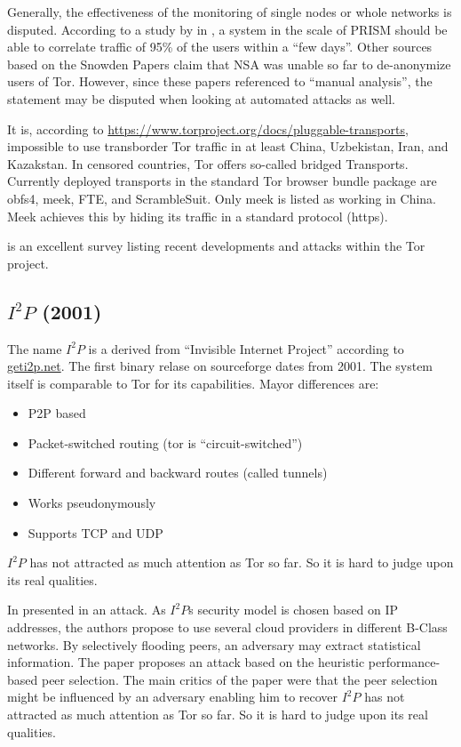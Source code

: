 Generally, the effectiveness of the monitoring of single nodes or whole networks is disputed. According to a study by \citeauthor{ccs2013-usersrouted} in \citeyear{ccs2013-usersrouted}\cite{ccs2013-usersrouted}, a system in the scale of PRISM should be able to correlate traffic of 95\% of the users within a ``few days''. Other sources based on the Snowden Papers claim that NSA was unable so far to de-anonymize users of  Tor. However, since these papers referenced to ``manual analysis'', the statement may be disputed when looking at automated attacks as well.

It is, according to \url{https://www.torproject.org/docs/pluggable-transports}, impossible to use transborder Tor traffic in at least China, Uzbekistan, Iran, and Kazakstan. In censored countries, Tor offers so-called bridged Transports. Currently deployed transports in the standard Tor browser bundle package are obfs4, meek, FTE, and ScrambleSuit. Only meek is listed as working in China. Meek achieves this by hiding its traffic in a standard protocol (https).

\cite{saleh2018shedding} is an excellent survey listing recent developments and attacks within the Tor project.

\subsection{\texorpdfstring{$I^2P$}{I2P} (2001)}
The name $I^2P$ is a derived from  ``Invisible Internet Project'' according to \href{https://geti2p.net/}{geti2p.net}. The first binary relase on sourceforge dates from 2001. The system itself is comparable to Tor for its capabilities. Mayor differences are:
\begin{itemize}
	\item P2P based
	\item Packet-switched routing (tor is ``circuit-switched'')
	\item Different forward and backward routes (called tunnels)
	\item Works pseudonymously
	\item Supports TCP and UDP
\end{itemize}

$I^2P$ has not attracted as much attention as Tor so far. So it is hard to judge upon its real qualities.

In \citeyear{pets2011-i2p} \citeauthor{pets2011-i2p} presented in \cite{pets2011-i2p} an attack. As $I^2P$s security model is chosen based on IP addresses, the authors propose to use several cloud providers in different B-Class networks. By selectively flooding peers, an adversary may extract statistical information. The paper proposes an attack based on the heuristic performance-based peer selection. The main critics of the paper were that the peer selection might be influenced by an adversary enabling him to recover $I^2P$ has not attracted as much attention as Tor so far. So it is hard to judge upon its real qualities.

